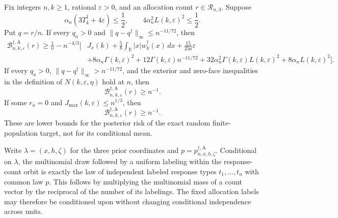 Fix integers \(n,k\ge1\), rational \(\varepsilon>0\), and an allocation count
\(r\in\mathcal R_{n,3}\).  Suppose
\[
\alpha_n(3T_k^\dagger+4\varepsilon)\le\frac12,
\qquad
4\alpha_n^2L(k,\varepsilon)^2\le\frac12.
\]
Put \(q=r/n\).  If every \(q_a>0\) and
\(\|q-q^\dagger\|_\infty\le n^{-11/72}\), then
\[
\begin{aligned}
\mathcal B_{n,k,\varepsilon}^{\dagger,\mathrm A}(r)
\ge\frac1n-n^{-4/3}\Bigg[&J_x(k)+\frac58
\int_{\mathbb R}|x|w_k^\dagger(x)\,dx+\frac{15}{256}\varepsilon\\
&+8\alpha_n\Gamma(k,\varepsilon)^2
+12\Gamma(k,\varepsilon)n^{-11/72}
+32\alpha_n^2\Gamma(k,\varepsilon)L(k,\varepsilon)^2
+8\alpha_nL(k,\varepsilon)^2\Bigg].
\end{aligned}
\tag{L}
\]
If every \(q_a>0\), \(\|q-q^\dagger\|_\infty>n^{-11/72}\), and the exterior and zero-face inequalities in the definition of
\(N(k,\varepsilon,\eta)\) hold at \(n\), then
\[
\mathcal B_{n,k,\varepsilon}^{\dagger,\mathrm A}(r)\ge n^{-1}.
\tag{X}
\]
If some \(r_a=0\) and
\(J_{\max}(k,\varepsilon)\le n^{1/3}\), then
\[
\mathcal B_{n,k,\varepsilon}^{\dagger,\mathrm A}(r)\ge n^{-1}.
\tag{Z}
\]
These are lower bounds for the posterior risk of the exact random finite-population target, not for its conditional mean.

Write \(\lambda=(x,h,\zeta)\) for the three prior coordinates and
\(p=p_{n,x,h,\zeta}^{\dagger,\mathrm A}\).  Conditional on \(\lambda\), the multinomial draw followed by a uniform labeling within the response-count orbit is exactly the law of independent labeled response types \(t_1,\ldots,t_n\) with common law \(p\).  This follows by multiplying the multinomial mass of a count vector by the reciprocal of the number of its labelings.  The fixed allocation labels may therefore be conditioned upon without changing conditional independence across units.

